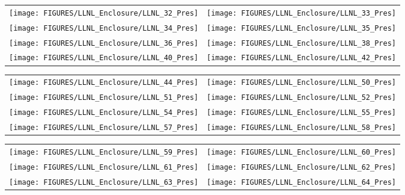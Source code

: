 \begin{figure}[p]
\begin{tabular*}{\textwidth}{l@{\extracolsep{\fill}}r}
\texttt{[image: FIGURES/LLNL\_Enclosure/LLNL\_32\_Pres]} &
\texttt{[image: FIGURES/LLNL\_Enclosure/LLNL\_33\_Pres]} \\
\texttt{[image: FIGURES/LLNL\_Enclosure/LLNL\_34\_Pres]} &
\texttt{[image: FIGURES/LLNL\_Enclosure/LLNL\_35\_Pres]} \\
\texttt{[image: FIGURES/LLNL\_Enclosure/LLNL\_36\_Pres]} &
\texttt{[image: FIGURES/LLNL\_Enclosure/LLNL\_38\_Pres]} \\
\texttt{[image: FIGURES/LLNL\_Enclosure/LLNL\_40\_Pres]} &
\texttt{[image: FIGURES/LLNL\_Enclosure/LLNL\_42\_Pres]}
\end{tabular*}
\label{LLNL_Enclosure_Pres_4}
\end{figure}

\begin{figure}[p]
\begin{tabular*}{\textwidth}{l@{\extracolsep{\fill}}r}
\texttt{[image: FIGURES/LLNL\_Enclosure/LLNL\_44\_Pres]} &
\texttt{[image: FIGURES/LLNL\_Enclosure/LLNL\_50\_Pres]} \\
\texttt{[image: FIGURES/LLNL\_Enclosure/LLNL\_51\_Pres]} &
\texttt{[image: FIGURES/LLNL\_Enclosure/LLNL\_52\_Pres]} \\
\texttt{[image: FIGURES/LLNL\_Enclosure/LLNL\_54\_Pres]} &
\texttt{[image: FIGURES/LLNL\_Enclosure/LLNL\_55\_Pres]} \\
\texttt{[image: FIGURES/LLNL\_Enclosure/LLNL\_57\_Pres]} &
\texttt{[image: FIGURES/LLNL\_Enclosure/LLNL\_58\_Pres]}
\end{tabular*}
\label{LLNL_Enclosure_Pres_5}
\end{figure}

\begin{figure}[p]
\begin{tabular*}{\textwidth}{l@{\extracolsep{\fill}}r}
\texttt{[image: FIGURES/LLNL\_Enclosure/LLNL\_59\_Pres]} &
\texttt{[image: FIGURES/LLNL\_Enclosure/LLNL\_60\_Pres]} \\
\texttt{[image: FIGURES/LLNL\_Enclosure/LLNL\_61\_Pres]} &
\texttt{[image: FIGURES/LLNL\_Enclosure/LLNL\_62\_Pres]} \\
\texttt{[image: FIGURES/LLNL\_Enclosure/LLNL\_63\_Pres]} &
\texttt{[image: FIGURES/LLNL\_Enclosure/LLNL\_64\_Pres]}
\end{tabular*}
\label{LLNL_Enclosure_Pres_6}
\end{figure}

